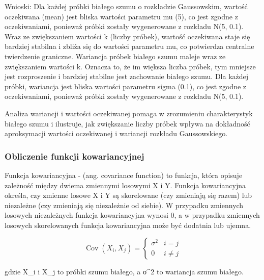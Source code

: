 \documentclass[11pt]{article}
\begin{document}
Wnioski: 
\newline * Dla każdej próbki białego szumu o rozkładzie Gaussowskim,
wartość oczekiwana (mean) jest bliska wartości parametru mu (5), co jest
zgodne z oczekiwaniami, ponieważ próbki zostały wygenerowane z rozkładu
N(5, 0.1). 
\newline * Wraz ze zwiększaniem wartości k (liczby próbek), wartość
oczekiwana staje się bardziej stabilna i zbliża się do wartości
parametru mu, co potwierdza centralne twierdzenie graniczne. 
\newline * Wariancja
próbek białego szumu maleje wraz ze zwiększaniem wartości k. Oznacza to,
że im większa liczba próbek, tym mniejsze jest rozproszenie i bardziej
stabilne jest zachowanie białego szumu. 
\newline * Dla każdej próbki, wariancja
jest bliska wartości parametru sigma (0.1), co jest zgodne z
oczekiwaniami, ponieważ próbki zostały wygenerowane z rozkładu N(5,
0.1).

Analiza wariancji i wartości oczekiwanej pomaga w zrozumieniu
charakterystyk białego szumu i ilustruje, jak zwiększanie liczby próbek
wpływa na dokładność aproksymacji wartości oczekiwanej i wariancji
rozkładu Gaussowskiego.

    \hypertarget{obliczenie-funkcji-kowariancyjnej}{%
\subsubsection{Obliczenie funkcji
kowariancyjnej}\label{obliczenie-funkcji-kowariancyjnej}}

Funkcja kowariancyjna - (ang. covariance function) to funkcja, która
opisuje zależność między dwiema zmiennymi losowymi X i Y. Funkcja
kowariancyjna określa, czy zmienne losowe X i Y są skorelowane (czy
zmieniają się razem) lub niezależne (czy zmieniają się niezależnie od
siebie). W przypadku zmiennych losowych niezależnych funkcja
kowariancyjna wynosi 0, a w przypadku zmiennych losowych skorelowanych
funkcja kowariancyjna może być dodatnia lub ujemna.

\[ \operatorname{Cov}(X_i, X_j) = \begin{cases} \sigma^2 & i = j \\ 0 & i \neq j \end{cases} \]

gdzie X\_i i X\_j to próbki szumu białego, a σ\^{}2 to wariancja szumu
białego.
\end{document}
